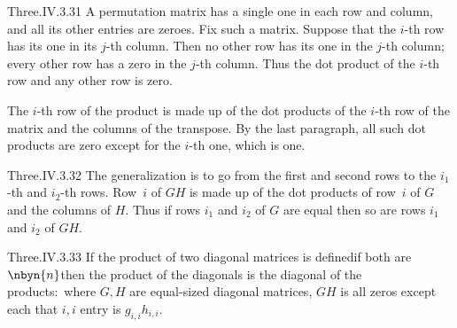 \begin{ans}{Three.IV.3.31}
      A permutation matrix has a single one in each row and column, and
      all its other entries are zeroes.
      Fix such a matrix.
      Suppose that the \( i \)-th row has its one in its \( j \)-th column.
      Then no other row has its one in the \( j \)-th column; every other
      row has a zero in the \( j \)-th column.
      Thus the dot product of the \( i \)-th row and any other row is zero.

      The \( i \)-th row of the product is made up of the dot products of the
      \( i \)-th row of the matrix and the columns of the transpose.
      By the last paragraph, all such dot products are zero except for the
      \( i \)-th one, which is one.
    
\end{ans}
\begin{ans}{Three.IV.3.32}
      The generalization is to go from the first and second rows to the
      $i_1$-th and $i_2$-th rows.
      Row~$i$ of \( GH \) is made up of the dot products of
      row~$i$ of \( G \) and the columns of \( H \).
      Thus if rows \( i_1 \) and \( i_2 \) of \( G \) are equal then so are
      rows \( i_1 \) and \( i_2 \) of \( GH \).
    
\end{ans}
\begin{ans}{Three.IV.3.33}
      If the product of two diagonal matrices is defined\Dash if
      both are $\nbyn{n}$\Dash then
      the product of the diagonals is the diagonal
      of the products:~where \( G,H \) are equal-sized diagonal matrices,
      \( GH \) is all zeros except each that \( i,i \) entry is
      \( g_{i,i}h_{i,i} \).
    
\end{ans}
